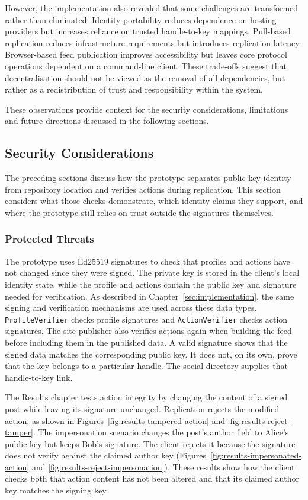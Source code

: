 However, the implementation also revealed that some challenges are
transformed rather than eliminated. Identity portability reduces
dependence on hosting providers but increases reliance on trusted
handle-to-key mappings. Pull-based replication reduces infrastructure
requirements but introduces replication latency. Browser-based feed
publication improves accessibility but leaves core protocol operations
dependent on a command-line client. These trade-offs suggest that
decentralisation should not be viewed as the removal of all
dependencies, but rather as a redistribution of trust and
responsibility within the system.

These observations provide context for the security considerations,
limitations and future directions discussed in the following sections.


\subsection{Security Considerations}

The preceding sections discuss how the prototype separates public-key
identity from repository location and verifies actions during replication.
This section considers what those checks demonstrate, which identity claims
they support, and where the prototype still relies on trust outside the
signatures themselves.

\subsubsection{Protected Threats}

The prototype uses Ed25519 signatures to check that profiles and actions
have not changed since they were signed. The private key is stored in the
client's local identity state, while the profile and actions contain the
public key and signature needed for verification. As described in
Chapter~\ref{sec:implementation}, the same signing and verification
mechanisms are used across these data types. \texttt{ProfileVerifier}
checks profile signatures and \texttt{ActionVerifier} checks action
signatures. The site publisher also verifies actions again when building
the feed before including them in the published data. A valid signature
shows that the signed data matches the corresponding public key. It does
not, on its
own, prove that the key belongs to a particular handle. The social
directory supplies that handle-to-key link.

The Results chapter tests action integrity by changing the content of a
signed post while leaving its signature unchanged. Replication rejects the
modified action, as shown in Figures~\ref{fig:results-tampered-action} and
\ref{fig:results-reject-tamper}. The impersonation scenario changes the
post's author field to Alice's public key but keeps Bob's signature. The
client rejects it because the signature does not verify against the claimed
author key (Figures~\ref{fig:results-impersonated-action} and
\ref{fig:results-reject-impersonation}). These results show how the client
checks both that action content has not been altered and that its claimed
author key matches the signing key.

